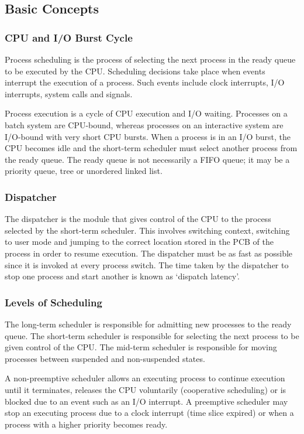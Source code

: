 \subsection{Basic Concepts}

\subsubsection{CPU and I/O Burst Cycle}

Process scheduling is the process of selecting the next process in the ready queue to be executed by the CPU.
Scheduling decisions take place when events interrupt the execution of a process.
Such events include clock interrupts, I/O interrupts, system calls and signals.

Process execution is a cycle of CPU execution and I/O waiting.
Processes on a batch system are CPU-bound, whereas processes on an interactive system are I/O-bound with very short CPU bursts.
When a process is in an I/O burst, the CPU becomes idle and the short-term scheduler must select another process from the ready queue.
The ready queue is not necessarily a FIFO queue; it may be a priority queue, tree or unordered linked list.

\subsubsection{Dispatcher}

The dispatcher is the module that gives control of the CPU to the process selected by the short-term scheduler.
This involves switching context, switching to user mode and jumping to the correct location stored in the PCB of the process in order to resume execution.
The dispatcher must be as fast as possible since it is invoked at every process switch.
The time taken by the dispatcher to stop one process and start another is known as `dispatch latency'.

\subsubsection{Levels of Scheduling}

The long-term scheduler is responsible for admitting new processes to the ready queue.
The short-term scheduler is responsible for selecting the next process to be given control of the CPU.
The mid-term scheduler is responsible for moving processes between suspended and non-suspended states.

A non-preemptive scheduler allows an executing process to continue execution until it terminates, releases the CPU voluntarily (cooperative scheduling) or is blocked due to an event such as an I/O interrupt.
A preemptive scheduler may stop an executing process due to a clock interrupt (time slice expired) or when a process with a higher priority becomes ready.

